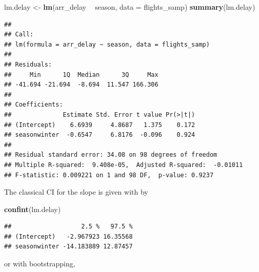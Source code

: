 \documentclass[]{book}
\newenvironment{Shaded}{\begin{snugshade}}{\end{snugshade}}
\newcommand{\CommentTok}[1]{\textcolor[rgb]{0.56,0.35,0.01}{\textit{#1}}}
\newcommand{\DataTypeTok}[1]{\textcolor[rgb]{0.13,0.29,0.53}{#1}}
\newcommand{\DecValTok}[1]{\textcolor[rgb]{0.00,0.00,0.81}{#1}}
\newcommand{\KeywordTok}[1]{\textcolor[rgb]{0.13,0.29,0.53}{\textbf{#1}}}
\newcommand{\NormalTok}[1]{#1}
\newcommand{\OperatorTok}[1]{\textcolor[rgb]{0.81,0.36,0.00}{\textbf{#1}}}
\newcommand{\OtherTok}[1]{\textcolor[rgb]{0.56,0.35,0.01}{#1}}
\newcommand{\StringTok}[1]{\textcolor[rgb]{0.31,0.60,0.02}{#1}}
\begin{document}
\begin{Shaded}
\begin{Highlighting}[]
\NormalTok{lm.delay <-}\StringTok{ }\KeywordTok{lm}\NormalTok{(arr_delay }\OperatorTok{~}\StringTok{ }\NormalTok{season, }\DataTypeTok{data =}\NormalTok{ flights_samp)}
\KeywordTok{summary}\NormalTok{(lm.delay)}
\end{Highlighting}
\end{Shaded}

\begin{verbatim}
## 
## Call:
## lm(formula = arr_delay ~ season, data = flights_samp)
## 
## Residuals:
##     Min      1Q  Median      3Q     Max 
## -41.694 -21.694  -8.694  11.547 166.306 
## 
## Coefficients:
##              Estimate Std. Error t value Pr(>|t|)
## (Intercept)    6.6939     4.8687   1.375    0.172
## seasonwinter  -0.6547     6.8176  -0.096    0.924
## 
## Residual standard error: 34.08 on 98 degrees of freedom
## Multiple R-squared:  9.408e-05,  Adjusted R-squared:  -0.01011 
## F-statistic: 0.009221 on 1 and 98 DF,  p-value: 0.9237
\end{verbatim}

The classical CI for the slope is given with by

\begin{Shaded}
\begin{Highlighting}[]
\KeywordTok{confint}\NormalTok{(lm.delay)}
\end{Highlighting}
\end{Shaded}

\begin{verbatim}
##                   2.5 %   97.5 %
## (Intercept)   -2.967923 16.35568
## seasonwinter -14.183889 12.87457
\end{verbatim}

or with bootstrapping,

\begin{Shaded}
\end{Shaded}
\end{document}
